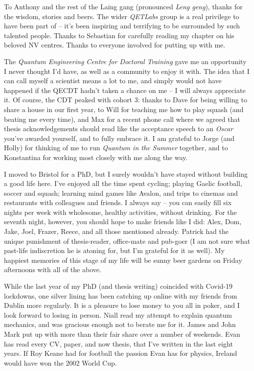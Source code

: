 To Anthony and the rest of the Laing gang (pronounced \emph{Leng geng}), 
    thanks for the wisdom, stories and beers.
The wider \emph{QETLabs} group is a real privilege to have been part of -- 
    it's been inspiring and terrifying to be surrounded by such talented people.
Thanks to Sebastian for carefully reading my chapter on his beloved NV centres.
Thanks to everyone involved for putting up with me. 
\par

The \emph{Quantum Engineering Centre for Doctoral Training} gave me an opportunity I 
    never thought I'd have, as well as a community to enjoy it with. 
The idea that I can call myself a scientist means a lot to me, 
    and simply would not have happened if the QECDT hadn't taken a chance on me -- 
    I will always appreciate it. 
Of course, the CDT peaked with cohort 3:
    thanks to Dave for being willing to share a house in our first year, 
    to Will for teaching me how to play squash (and beating me every time), 
    and Max for a recent phone call where we agreed that thesis acknowledgements should
    read like the acceptance speech to an \emph{Oscar} you've awarded yourself, and to fully embrace it. 
I am grateful to Jorge (and Holly) for thinking of me to run \emph{Quantum in the Summer} together,
    and to Konstantina for working most closely with me along the way.  
\par 

I moved to Bristol for a PhD, 
    but I surely wouldn't have stayed without building a good life here. 
I've enjoyed all the time spent cycling; playing Gaelic football, soccer and squash;
    learning mind games like Avalon, and trips to cinemas and restaurants with colleagues and friends. 
I always say -- you can easily fill six nights per week with wholesome, healthy activities, 
    without drinking. 
For the seventh night, however, you should hope to make friends like I did:
    Alex, Dom, Jake, Joel, Frazer, Reece, and all those mentioned already.
Patrick had the unique punishment of thesis-reader, office-mate and pub-goer 
    (I am not sure what past-life indiscretion he is atoning for, but I'm grateful for it as well). 
My happiest memories of this stage of my life will be sunny beer gardens on Friday afternoons with all of the above. 

While the last year of my PhD (and thesis writing) coincided with Covid-19 lockdowns, 
    one silver lining has been catching up online with my friends from Dublin more regularly. 
It is a pleasure to lose money to you all in poker, and I look forward to losing in person. 
Niall read my attempt to explain quantum mechanics, 
    and was gracious enough not to berate me for it. 
James and John Mark put up with more than their fair share over a number of weekends. 
Evan has read every CV, paper, and now thesis, that I've written in the last eight years. 
If Roy Keane had for football the passion Evan has for physics, 
    Ireland would have won the 2002 World Cup.
\par 

